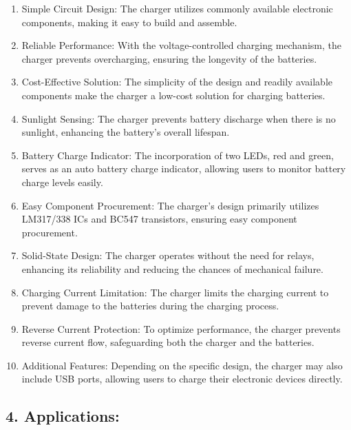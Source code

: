 \documentclass[twocolumn]{article}
\begin{document}
\begin{enumerate}
    \item Simple Circuit Design: The charger utilizes commonly available electronic components, making it easy to build and assemble.

    \item Reliable Performance: With the voltage-controlled charging mechanism, the charger prevents overcharging, ensuring the longevity of the batteries.

    \item Cost-Effective Solution: The simplicity of the design and readily available components make the charger a low-cost solution for charging batteries.

    \item Sunlight Sensing: The charger prevents battery discharge when there is no sunlight, enhancing the battery's overall lifespan.

    \item Battery Charge Indicator: The incorporation of two LEDs, red and green, serves as an auto battery charge indicator, allowing users to monitor battery charge levels easily.

    \item Easy Component Procurement: The charger's design primarily utilizes LM317/338 ICs and BC547 transistors, ensuring easy component procurement.

    \item Solid-State Design: The charger operates without the need for relays, enhancing its reliability and reducing the chances of mechanical failure.

    \item Charging Current Limitation: The charger limits the charging current to prevent damage to the batteries during the charging process.

    \item Reverse Current Protection: To optimize performance, the charger prevents reverse current flow, safeguarding both the charger and the batteries.

    \item Additional Features: Depending on the specific design, the charger may also include USB ports, allowing users to charge their electronic devices directly.
    
\end{enumerate}

\subsection*{4. Applications:}
\end{document}
